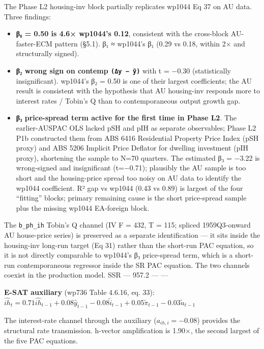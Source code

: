 \documentclass[
]{article}
\providecommand{\tightlist}{%
  \setlength{\itemsep}{0pt}\setlength{\parskip}{0pt}}
\begin{document}
The Phase L2 housing-inv block partially replicates wp1044 Eq 37 on AU
data. Three findings:

\begin{itemize}
\tightlist
\item
  \textbf{β₀ = 0.50 is 4.6× wp1044's 0.12}, consistent with the
  cross-block AU-faster-ECM pattern (§5.1). β₁ ≈ wp1044's β₁ (0.29 vs
  0.18, within 2× and structurally signed).
\item
  \textbf{β₂ wrong sign on contemp \texttt{(Δy\ −\ ỹ)}} with t = −0.30
  (statistically insignificant). wp1044's β₂ = 0.50 is one of their
  largest coefficients; the AU result is consistent with the hypothesis
  that AU housing-inv responds more to interest rates / Tobin's Q than
  to contemporaneous output growth gap.
\item
  \textbf{β₃ price-spread term active for the first time in Phase L2}.
  The earlier-AUSPAC OLS lacked pSH and pIH as separate observables;
  Phase L2 P1b constructed them from ABS 6416 Residential Property Price
  Index (pSH proxy) and ABS 5206 Implicit Price Deflator for dwelling
  investment (pIH proxy), shortening the sample to N=70 quarters. The
  estimated β₃ = −3.22 is wrong-signed and insignificant (t=−0.71);
  plausibly the AU sample is too short and the housing-price spread too
  noisy on AU data to identify the wp1044 coefficient. R² gap vs wp1044
  (0.43 vs 0.89) is largest of the four ``fitting'' blocks; primary
  remaining cause is the short price-spread sample plus the missing
  wp1044 EA-foreign block.
\end{itemize}

The \texttt{b\_ph\_ih} Tobin's Q channel (IV F = 432, T = 115; spliced
1959Q3-onward AU house-price series) is preserved as a separate
identification --- it sits inside the housing-inv long-run target (Eq
31) rather than the short-run PAC equation, so it is not directly
comparable to wp1044's β₃ price-spread term, which is a short-run
contemporaneous regressor inside the SR PAC equation. The two channels
coexist in the production model. \textbar{} SSR \textbar{} ---
\textbar{} 957.2 \textbar{} --- \textbar{} --- \textbar{}

\textbf{E-SAT auxiliary} (wp736 Table 4.6.16, eq. 33):
\(\widehat{ih}_t = 0.71 \widehat{ih}_{t-1} + 0.08 \hat{y}_{t-1} - 0.08 \tilde{i}_{t-1} + 0.05 \tilde{\pi}_{t-1} - 0.03 \tilde{u}_{t-1}\)

The interest-rate channel through the auxiliary (\(a_{ih,i} = -0.08\))
provides the structural rate transmission. h-vector amplification is
1.90×, the second largest of the five PAC equations.
\end{document}
